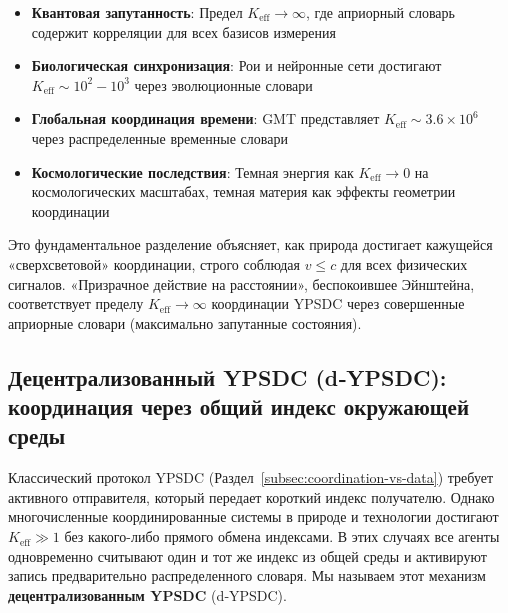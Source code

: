 \documentclass[11pt,a4paper]{article}
\begin{document}
	\begin{itemize}
		\item \textbf{Квантовая запутанность}: Предел $K_{\mathrm{eff}} \to \infty$, где априорный словарь содержит корреляции для всех базисов измерения
		
		\item \textbf{Биологическая синхронизация}: Рои и нейронные сети достигают $K_{\mathrm{eff}} \sim 10^2-10^3$ через эволюционные словари
		
		\item \textbf{Глобальная координация времени}: GMT представляет $K_{\mathrm{eff}} \sim 3.6\times10^6$ через распределенные временные словари
		
		\item \textbf{Космологические последствия}: Темная энергия как $K_{\mathrm{eff}} \to 0$ на космологических масштабах, темная материя как эффекты геометрии координации
	\end{itemize}
	
	Это фундаментальное разделение объясняет, как природа достигает кажущейся «сверхсветовой» координации, строго соблюдая $v \leq c$ для всех физических сигналов. «Призрачное действие на расстоянии», беспокоившее Эйнштейна, соответствует пределу $K_{\mathrm{eff}} \to \infty$ координации YPSDC через совершенные априорные словари (максимально запутанные состояния).
	
	\subsection{Децентрализованный YPSDC (d‑YPSDC): координация через общий индекс окружающей среды}
	\label{subsec:d-ypsdc}
	
	Классический протокол YPSDC (Раздел~\ref{subsec:coordination-vs-data}) требует активного отправителя,
	который передает короткий индекс получателю. Однако многочисленные координированные системы в природе и технологии
	достигают $K_{\mathrm{eff}} \gg 1$ без какого-либо прямого обмена индексами. В этих случаях все агенты
	одновременно считывают один и тот же индекс из общей среды и активируют запись предварительно распределенного
	словаря. Мы называем этот механизм \textbf{децентрализованным YPSDC} (d‑YPSDC).
	
\end{document}
